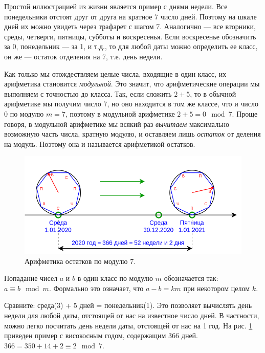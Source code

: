 Простой иллюстрацией из жизни является пример с днями недели. Все понедельники отстоят друг от друга на кратное 7 число дней. Поэтому на шкале дней их можно увидеть через трафарет с шагом 7. Аналогично --- все вторники, среды, четверги, пятницы, субботы и воскресенья. Если воскресенье обозначить за 0, понедельник --- за 1, и т.д., то для любой даты можно определить ее класс, он же --- остаток отделения на 7, т.е. день недели.

Как только мы отождествляем целые числа, входящие в один класс, их арифметика становится \textit{модульной}. Это значит, что арифметические операции мы выполняем с точностью до класса. Так, если сложить $2+5$, то в обычной арифметике мы получим число 7, но оно находится в том же классе, что и число 0 по модулю $m=7$, поэтому в модульной арифметике $2+5=0\mod 7$. Проще говоря, в модульной арифметике мы всякий раз \textit{вычитаем} максимально возможную часть числа, кратную модулю, и оставляем лишь \textit{остаток} от деления на модуль. Поэтому она и называется арифметикой остатков.

\begin{figure}[hbt!]
\begin{center}
\includegraphics[scale=0.4]{../weekdays.png}
\end{center}
\caption{Арифметика остатков по модулю 7.}\label{weekdays}
\end{figure}

Попадание чисел $a$ и $b$ в один класс по модулю $m$ обозначается так: $a\equiv b\mod m$. Формально это означает, что $a-b=km$ при некотором целом $k$.

Сравните: среда(3) + 5 дней = понедельник(1). Это позволяет вычислять день недели для любой даты, отстоящей от нас на известное число дней. В частности, можно легко посчитать день недели даты, отстоящей от нас на 1 год. На рис.
\ref{weekdays} приведен пример с високосным годом, содержащим 366 дней. $366=350+14+2\equiv 2\mod 7$.

